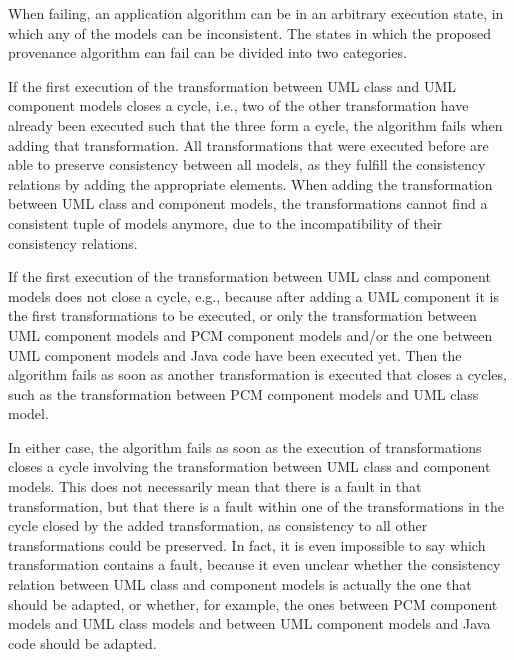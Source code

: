 When failing, an application algorithm can be in an arbitrary execution state, in which any of the models can be inconsistent.
The states in which the proposed provenance algorithm can fail can be divided into two categories.
\begin{properenumerate}
    \item If the first execution of the transformation between \gls{UML} class and \gls{UML} component models closes a cycle, i.e., two of the other transformation have already been executed such that the three form a cycle, the algorithm fails when adding that transformation.
    All transformations that were executed before are able to preserve consistency between all models, as they fulfill the consistency relations by adding the appropriate elements.
    When adding the transformation between \gls{UML} class and component models, the transformations cannot find a consistent tuple of models anymore, due to the incompatibility of their consistency relations.
    \item If the first execution of the transformation between \gls{UML} class and component models does not close a cycle, e.g., because after adding a \gls{UML} component it is the first transformations to be executed, or only the transformation between \gls{UML} component models and \gls{PCM} component models and/or the one between \gls{UML} component models and Java code have been executed yet.
    Then the algorithm fails as soon as another transformation is executed that closes a cycles, such as the transformation between \gls{PCM} component models and \gls{UML} class model.
\end{properenumerate}
In either case, the algorithm fails as soon as the execution of transformations closes a cycle involving the transformation between \gls{UML} class and component models.
This does not necessarily mean that there is a fault in that transformation, but that there is a fault within one of the transformations in the cycle closed by the added transformation, as consistency to all other transformations could be preserved.
In fact, it is even impossible to say which transformation contains a fault, because it even unclear whether the consistency relation between \gls{UML} class and component models is actually the one that should be adapted, or whether, for example, the ones between \gls{PCM} component models and \gls{UML} class models and between \gls{UML} component models and Java code should be adapted.

